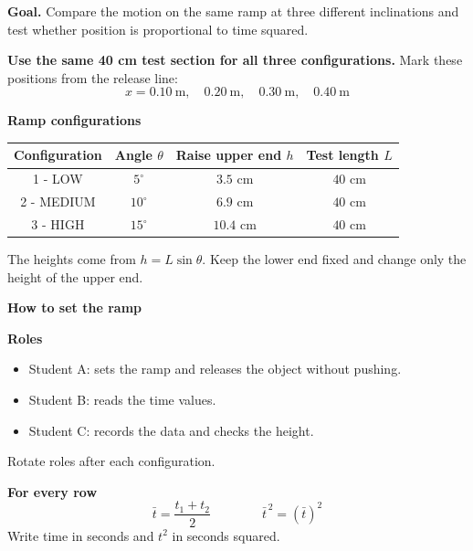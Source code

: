 \documentclass[10pt,a4paper,landscape]{article}
\begin{document}
\vspace{1.5mm}
\begin{minipage}[t]{0.52\textwidth}
\textbf{Goal.} Compare the motion on the same ramp at three different inclinations and test whether position is proportional to time squared.

\textbf{Use the same 40 cm test section for all three configurations.}
Mark these positions from the release line:
\[
\boxed{x=0.10\ \text{m},\quad 0.20\ \text{m},\quad 0.30\ \text{m},\quad 0.40\ \text{m}}
\]

\textbf{Ramp configurations}
\begin{center}
\begin{tabular}{|c|c|c|c|}
\hline
\textbf{Configuration} & \textbf{Angle $\theta$} & \textbf{Raise upper end $h$} & \textbf{Test length $L$} \\
\hline
1 - LOW & $5^\circ$ & $3.5$ cm & $40$ cm \\
\hline
2 - MEDIUM & $10^\circ$ & $6.9$ cm & $40$ cm \\
\hline
3 - HIGH & $15^\circ$ & $10.4$ cm & $40$ cm \\
\hline
\end{tabular}
\end{center}

{\small The heights come from $h=L\sin\theta$. Keep the lower end fixed and change only the height of the upper end.}
\end{minipage}
\hfill
\begin{minipage}[t]{0.45\textwidth}
\textbf{How to set the ramp}
\begin{center}
\end{center}

\textbf{Roles}
\begin{itemize}[leftmargin=5mm,itemsep=0pt,topsep=1pt]
  \item Student A: sets the ramp and releases the object without pushing.
  \item Student B: reads the time values.
  \item Student C: records the data and checks the height.
\end{itemize}
Rotate roles after each configuration.

\textbf{For every row}
\[
\bar t=\frac{t_1+t_2}{2}
\qquad\qquad
\bar t^{\,2}=(\bar t)^2
\]
Write time in seconds and $t^2$ in seconds squared.
\end{minipage}
\end{document}
